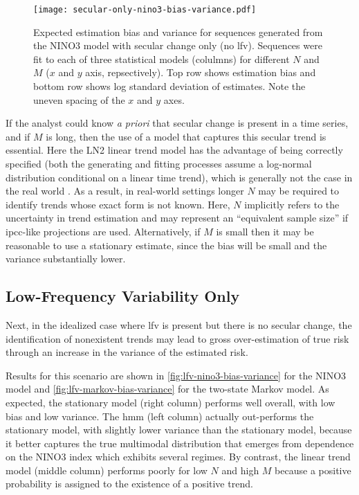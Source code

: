 \documentclass[
]{agujournal2018}
\begin{document}
\begin{figure}
  \centering
  \texttt{[image: secular-only-nino3-bias-variance.pdf]}
  \caption{
    Expected estimation bias and variance for sequences generated from the NINO3 model with secular change only (no \gls{lfv}).
    Sequences were fit to each of three statistical models (colulmns) for different $N$ and $M$ ($x$ and $y$ axis, repsectively).
    Top row shows estimation bias and bottom row shows log standard deviation of estimates.
    Note the uneven spacing of the $x$ and $y$ axes.
  }\label{fig:secular-nino3-bias-variance}
\end{figure}

If the analyst could know \emph{a priori} that secular change is present in a time series, and if $M$ is long, then the use of a model that captures this secular trend is essential.
Here the LN2 linear trend model has the advantage of being correctly specified (both the generating and fitting processes assume a log-normal distribution conditional on a linear time trend), which is generally not the case in the real world \citep{Serinaldi:2015bq, Montanari:2014hl}.
As a result, in real-world settings longer $N$ may be required to identify trends whose exact form is not known.
Here, $N$ implicitly refers to the uncertainty in trend estimation and may represent an ``equivalent sample size'' if \gls{ipcc}-like projections are used.
Alternatively, if $M$ is small then it may be reasonable to use a stationary estimate, since the bias will be small and the variance substantially lower.

\subsection{Low-Frequency Variability Only}

Next, in the idealized case where  \gls{lfv} is present but there is no secular change, the identification of nonexistent trends may lead to gross over-estimation of true risk through an increase in the variance of the estimated risk.

Results for this scenario are shown in \cref{fig:lfv-nino3-bias-variance} for the NINO3 model and \cref{fig:lfv-markov-bias-variance} for the two-state Markov model.
As expected, the stationary model (right column) performs well overall, with low bias and low variance.
The \gls{hmm} (left column) actually out-performs the stationary model, with slightly lower variance than the stationary model, because it better captures the true multimodal distribution that emerges from dependence on the NINO3 index which exhibits several regimes.
By contrast, the linear trend model (middle column) performs poorly for low $N$ and high $M$ because a positive probability is assigned to the existence of a positive trend.
\end{document}
